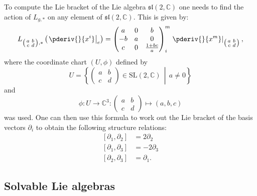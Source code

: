     \begin{example}
        To compute the Lie bracket of the Lie algebra $\mathfrak{sl}(2,\mathbb{C})$ one needs to find the action of $L_{g,*}$ on any element of $\mathfrak{sl}(2,\mathbb{C})$. This is given by:
        \begin{gather}
            L_{\left(\begin{smallmatrix}a&b\\c&d\end{smallmatrix}\right),*}\left(\left.\pderiv{}{x^i}\right|_e\right)
            = \begin{pmatrix}a&0&b\\-b&a&0\\c&0&\frac{1+bc}{a}\end{pmatrix}^m_i\left.\pderiv{}{x^m}\right|_{\left(\begin{smallmatrix}a&b\\c&d\end{smallmatrix}\right)},
        \end{gather}
        where the coordinate chart $(U,\phi)$ defined by \[U = \left\{\begin{pmatrix}a&b\\c&d\end{pmatrix}\in\mathrm{SL}(2,\mathbb{C})\,\middle\vert\,a\neq0\right\}\] and \[\phi:U\rightarrow\mathbb{C}^3:\begin{pmatrix}a&b\\c&d\end{pmatrix}\mapsto(a,b,c)\] was used. One can then use this formula to work out the Lie bracket of the basis vectors $\partial_i$ to obtain the following structure relations:
        \begin{align}
            \label{lie:sl2c_lie_brackets}
            [\partial_1,\partial_2] &= 2\partial_2\nonumber\\
            [\partial_1,\partial_3] &= -2\partial_3\\
            [\partial_2,\partial_3] &= \partial_1.\nonumber
        \end{align}
    \end{example}

\subsection{Solvable Lie algebras}


